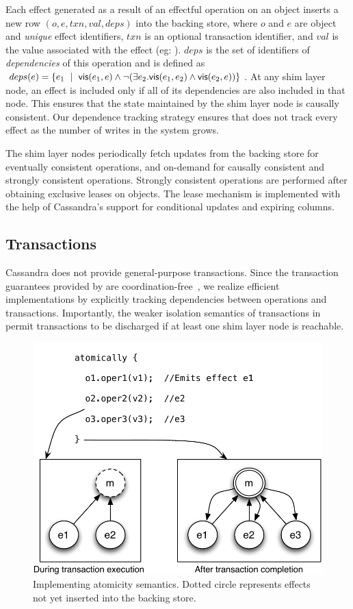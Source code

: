 Each effect generated as a result of an effectful operation on an object
inserts a new row $(o,\allowbreak e,\allowbreak txn,\allowbreak val,
\allowbreak deps)$ into the backing store, where $o$ and $e$ are object and
\emph{unique} effect identifiers, $txn$ is an optional transaction identifier,
and $val$ is the value associated with the effect (eg: ).
$deps$ is the set of identifiers of \emph{dependencies} of this operation and
is defined as $deps(e) = \{e_1 ~\mid~ {\normalfont \textsf{vis}(e_1,e)} \wedge \neg(\exists
e_2.{\normalfont \textsf{vis}(e_1,e_2)} \wedge {\normalfont \textsf{vis}(e_2,e)})\}$. At any shim layer node, an effect
is included only if all of its dependencies are also included in that node.
This ensures that the state maintained by the shim layer node is causally
consistent. Our dependence tracking strategy ensures that \name does not track
every effect as the number of writes in the system grows.

The shim layer nodes periodically fetch updates from the backing store for
eventually consistent operations, and on-demand for causally consistent and
strongly consistent operations. Strongly consistent operations are performed
after obtaining exclusive leases on objects. The lease mechanism is implemented
with the help of Cassandra's support for conditional updates and expiring
columns.

\subsection{Transactions}

Cassandra does not provide general-purpose transactions. Since the transaction
guarantees provided by \name are coordination-free~\cite{BailisHAT}, we realize
efficient implementations by explicitly tracking dependencies between
operations and transactions. Importantly, the weaker isolation semantics of
transactions in \name permit transactions to be discharged if at least one shim
layer node is reachable.

\begin{figure}
\begin{center}
\includegraphics[width=0.7\columnwidth]{Figures/AtomicityImpl}
\end{center}
\caption{Implementing atomicity semantics. Dotted circle represents effects not
yet inserted into the backing store.}
\label{fig:atomicity_impl}
\end{figure}

